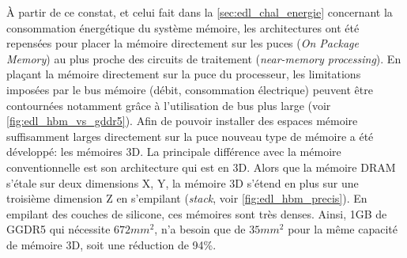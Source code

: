     
        À partir de ce constat, et celui fait dans la \autoref{sec:edl_chal_energie} concernant la consommation énergétique du système mémoire, les architectures ont été repensées pour placer la mémoire directement sur les puces (\textit{On Package Memory}) au plus proche des circuits de traitement (\textit{near-memory processing}). En plaçant la mémoire directement sur la puce du processeur, les limitations imposées par le bus mémoire (débit, consommation électrique) peuvent être contournées notamment grâce à l'utilisation de bus plus large (voir \autoref{fig:edl_hbm_vs_gddr5}). Afin de pouvoir installer des espaces mémoire suffisamment larges directement sur la puce nouveau type de mémoire a été développé: les mémoires 3D. La principale différence avec la mémoire conventionnelle est son architecture qui est en 3D. Alors que la mémoire DRAM s’étale sur deux dimensions X, Y, la mémoire 3D s’étend en plus sur une troisième dimension Z en s’empilant (\textit{stack}, voir \autoref{fig:edl_hbm_precis}). En empilant des couches de silicone, ces mémoires sont très denses. Ainsi, 1GB de GGDR5 qui nécessite $672 mm^2$, n'a besoin que de $35 mm^2$ pour la même capacité de mémoire 3D, soit une réduction de 94\%. 
        
                   
        
